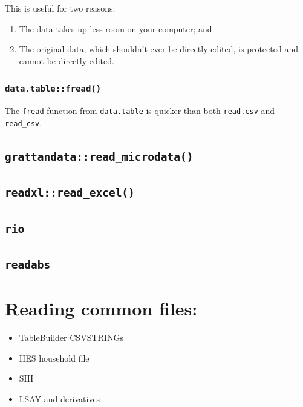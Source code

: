 \documentclass[
]{book}
\providecommand{\tightlist}{%
  \setlength{\itemsep}{0pt}\setlength{\parskip}{0pt}}
\begin{document}
This is useful for two reasons:

\begin{enumerate}
\def\labelenumi{\arabic{enumi}.}
\tightlist
\item
  The data takes up less room on your computer; and
\item
  The original data, which shouldn't ever be directly edited, is protected and cannot be directly edited.
\end{enumerate}

\hypertarget{data.tablefread}{%
\subsubsection{\texorpdfstring{\texttt{data.table::fread()}}{data.table::fread()}}\label{data.tablefread}}

The \texttt{fread} function from \texttt{data.table} is quicker than both \texttt{read.csv} and \texttt{read\_csv}.

\hypertarget{read_microdata}{%
\subsection{\texorpdfstring{\texttt{grattandata::read\_microdata()}}{grattandata::read\_microdata()}}\label{read_microdata}}

\hypertarget{readxlread_excel}{%
\subsection{\texorpdfstring{\texttt{readxl::read\_excel()}}{readxl::read\_excel()}}\label{readxlread_excel}}

\hypertarget{rio}{%
\subsection{\texorpdfstring{\texttt{rio}}{rio}}\label{rio}}

\hypertarget{readabs}{%
\subsection{\texorpdfstring{\texttt{readabs}}{readabs}}\label{readabs}}

\hypertarget{reading-common-files}{%
\section{Reading common files:}\label{reading-common-files}}

\begin{itemize}
\tightlist
\item
  TableBuilder CSVSTRINGs
\item
  HES household file
\item
  SIH
\item
  LSAY and derivatives
\end{itemize}
\end{document}
